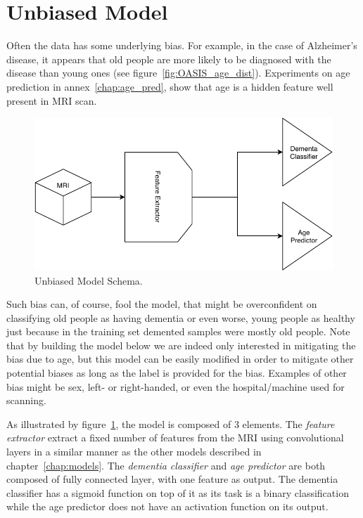 \section{Unbiased Model}
\label{sec:unbias_model}

Often the data has some underlying bias. For example, in the case of Alzheimer’s disease, it appears that old people are more likely to be diagnosed with the disease than young ones (see figure~\ref{fig:OASIS_age_dist}). Experiments on age prediction in annex~\ref{chap:age_pred}, show that age is a hidden feature well present in MRI scan.

\begin{figure}
 \centering
 \includegraphics[width=.9\linewidth]{figures/models/Unbias_model.pdf}
 \captionsetup{width=.9\linewidth}
 \caption[UnbiasModelSchema]{Unbiased Model Schema.}
 \label{fig:unbias_model_schema}
\end{figure}

Such bias can, of course, fool the model, that might be overconfident on classifying old people as having dementia or even worse, young people as healthy just because in the training set demented samples were mostly old people.
Note that by building the model below we are indeed only interested in mitigating the bias due to age, but this model can be easily modified in order to mitigate other potential biases as long as the label is provided for the bias. Examples of other bias might be sex, left- or right-handed, or even the hospital/machine used for scanning.


As illustrated by figure~\ref{fig:unbias_model_schema}, the model is composed of 3 elements. The \textit{feature extractor} extract a fixed number of features from the MRI using convolutional layers in a similar manner as the other models described in chapter~\ref{chap:models}. The \textit{dementia classifier} and \textit{age predictor} are both composed of fully connected layer, with one feature as output. The dementia classifier has a sigmoid function on top of it as its task is a binary classification while the age predictor does not have an activation function on its output.

